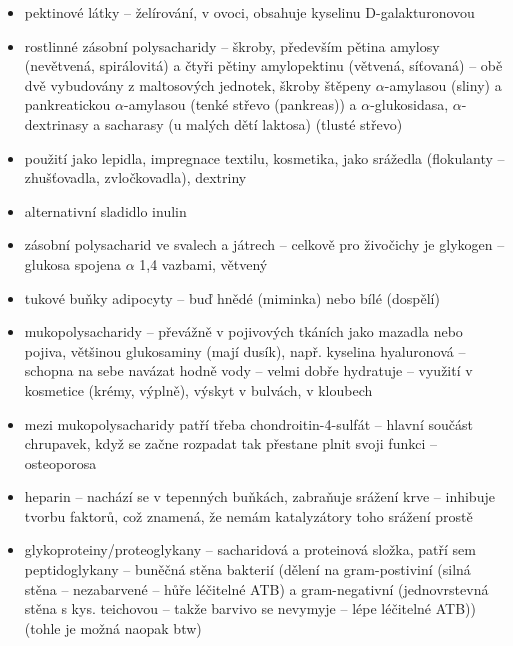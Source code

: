 \documentclass{article}
\begin{document}
\begin{itemize}
  \item pektinové látky -- želírování, v ovoci, obsahuje kyselinu D-galakturonovou
  \item rostlinné zásobní polysacharidy -- škroby, především pětina amylosy (nevětvená, spirálovitá) a čtyři pětiny amylopektinu (větvená, síťovaná) -- obě dvě vybudovány z maltosových jednotek, škroby štěpeny $\alpha$-amylasou (sliny) a pankreatickou $\alpha$-amylasou (tenké střevo (pankreas)) a $\alpha$-glukosidasa, $\alpha$-dextrinasy a sacharasy (u malých dětí laktosa) (tlusté střevo)
  \item použití jako lepidla, impregnace textilu, kosmetika, jako srážedla (flokulanty -- zhušťovadla, zvločkovadla), dextriny
  \item alternativní sladidlo inulin
  \item zásobní polysacharid ve svalech a játrech -- celkově pro živočichy je glykogen -- glukosa spojena $\alpha$ 1,4 vazbami, větvený
  \item tukové buňky adipocyty -- buď hnědé (miminka) nebo bílé (dospělí)
  \item mukopolysacharidy -- převážně v pojivových tkáních jako mazadla nebo pojiva, většinou glukosaminy (mají dusík), např. kyselina hyaluronová -- schopna na sebe navázat hodně vody -- velmi dobře hydratuje -- využití v kosmetice (krémy, výplně), výskyt v bulvách, v kloubech
  \item mezi mukopolysacharidy patří třeba chondroitin-4-sulfát -- hlavní součást chrupavek, když se začne rozpadat tak přestane plnit svoji funkci -- osteoporosa
  \item heparin -- nachází se v tepenných buňkách, zabraňuje srážení krve -- inhibuje tvorbu faktorů, což znamená, že nemám katalyzátory toho srážení prostě
  \item glykoproteiny/proteoglykany -- sacharidová a proteinová složka, patří sem peptidoglykany -- buněčná stěna bakterií (dělení na gram-postiviní (silná stěna -- nezabarvené -- hůře léčitelné ATB) a gram-negativní (jednovrstevná stěna s kys. teichovou -- takže barvivo se nevymyje -- lépe léčitelné ATB)) (tohle je možná naopak btw)

\end{itemize}
\end{document}
